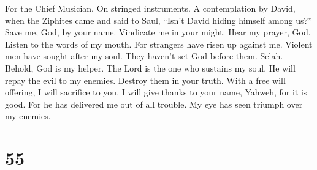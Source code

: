 For the Chief Musician. On stringed instruments. A contemplation by
David, when the Ziphites came and said to Saul, ``Isn't David hiding
himself among us?''  Save me, God, by your name. Vindicate
me in your might.  Hear my prayer, God. Listen to the
words of my mouth.  For strangers have risen up against
me. Violent men have sought after my soul. They haven't set God before
them. Selah.  Behold, God is my helper. The Lord is the
one who sustains my soul.  He will repay the evil to my
enemies. Destroy them in your truth.  With a free will
offering, I will sacrifice to you. I will give thanks to your name,
Yahweh, for it is good.  For he has delivered me out of
all trouble. My eye has seen triumph over my enemies.

\hypertarget{section-54}{%
\section{55}\label{section-54}}

